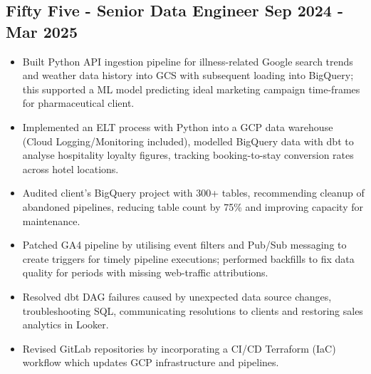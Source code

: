 \documentclass[a4paper, 10pt]{article}
\begin{document}
\subsection*{\textbf{Fifty Five - Senior Data Engineer} \hfill  Sep 2024 - Mar 2025}
\begin{itemize}[noitemsep]
    \item Built Python API ingestion pipeline for illness-related Google search trends and weather data history into GCS with subsequent loading into BigQuery; this supported a ML model predicting ideal marketing campaign time-frames for pharmaceutical client.
    \item Implemented an ELT process with Python into a GCP data warehouse (Cloud Logging/Monitoring included), modelled BigQuery data with dbt to analyse hospitality loyalty figures, tracking booking-to-stay conversion rates across hotel locations.
    \item Audited client's BigQuery project with 300+ tables, recommending cleanup of abandoned pipelines, reducing table count by 75\% and improving capacity for maintenance.
    \item Patched GA4 pipeline by utilising event filters and Pub/Sub messaging to create triggers for timely pipeline executions; performed backfills to fix data quality for periods with missing web-traffic attributions.
    \item Resolved dbt DAG failures caused by unexpected data source changes, troubleshooting SQL, communicating resolutions to clients and restoring sales analytics in Looker.
    \item Revised GitLab repositories by incorporating a CI/CD Terraform (IaC) workflow which updates GCP infrastructure and pipelines.
\end{itemize}
\end{document}
